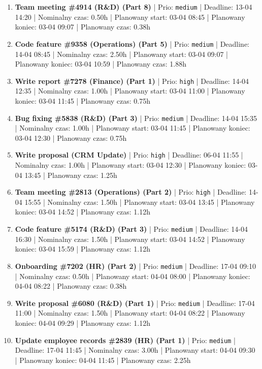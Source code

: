 {\begin{enumerate}
  \item [\textbf{14638}] \textbf{Team meeting \#4914 (R\&D) (Part 8)} | Prio: \texttt{medium} | Deadline: 13-04 14:20 | Nominalny czas: 0.50h | Planowany start: 03-04 08:45 | Planowany koniec: 03-04 09:07 | Planowany czas: 0.38h
  \item [\textbf{14661}] \textbf{Code feature \#9358 (Operations) (Part 5)} | Prio: \texttt{medium} | Deadline: 14-04 08:45 | Nominalny czas: 2.50h | Planowany start: 03-04 09:07 | Planowany koniec: 03-04 10:59 | Planowany czas: 1.88h
  \item [\textbf{14609}] \textbf{Write report \#7278 (Finance) (Part 1)} | Prio: \texttt{high} | Deadline: 14-04 12:35 | Nominalny czas: 1.00h | Planowany start: 03-04 11:00 | Planowany koniec: 03-04 11:45 | Planowany czas: 0.75h
  \item [\textbf{14637}] \textbf{Bug fixing \#5838 (R\&D) (Part 3)} | Prio: \texttt{medium} | Deadline: 14-04 15:35 | Nominalny czas: 1.00h | Planowany start: 03-04 11:45 | Planowany koniec: 03-04 12:30 | Planowany czas: 0.75h
  \item [\textbf{14629}] \textbf{Write proposal (CRM Update)} | Prio: \texttt{high} | Deadline: 06-04 11:55 | Nominalny czas: 1.00h | Planowany start: 03-04 12:30 | Planowany koniec: 03-04 13:45 | Planowany czas: 1.25h
  \item [\textbf{14617}] \textbf{Team meeting \#2813 (Operations) (Part 2)} | Prio: \texttt{high} | Deadline: 14-04 15:55 | Nominalny czas: 1.50h | Planowany start: 03-04 13:45 | Planowany koniec: 03-04 14:52 | Planowany czas: 1.12h
  \item [\textbf{14646}] \textbf{Code feature \#5174 (R\&D) (Part 3)} | Prio: \texttt{medium} | Deadline: 14-04 16:30 | Nominalny czas: 1.50h | Planowany start: 03-04 14:52 | Planowany koniec: 03-04 15:59 | Planowany czas: 1.12h
  \item [\textbf{14648}] \textbf{Onboarding \#7202 (HR) (Part 2)} | Prio: \texttt{medium} | Deadline: 17-04 09:10 | Nominalny czas: 0.50h | Planowany start: 04-04 08:00 | Planowany koniec: 04-04 08:22 | Planowany czas: 0.38h
  \item [\textbf{14669}] \textbf{Write proposal \#6080 (R\&D) (Part 1)} | Prio: \texttt{medium} | Deadline: 17-04 11:00 | Nominalny czas: 1.50h | Planowany start: 04-04 08:22 | Planowany koniec: 04-04 09:29 | Planowany czas: 1.12h
  \item [\textbf{14670}] \textbf{Update employee records \#2839 (HR) (Part 1)} | Prio: \texttt{medium} | Deadline: 17-04 11:45 | Nominalny czas: 3.00h | Planowany start: 04-04 09:30 | Planowany koniec: 04-04 11:45 | Planowany czas: 2.25h

\end{enumerate}}
